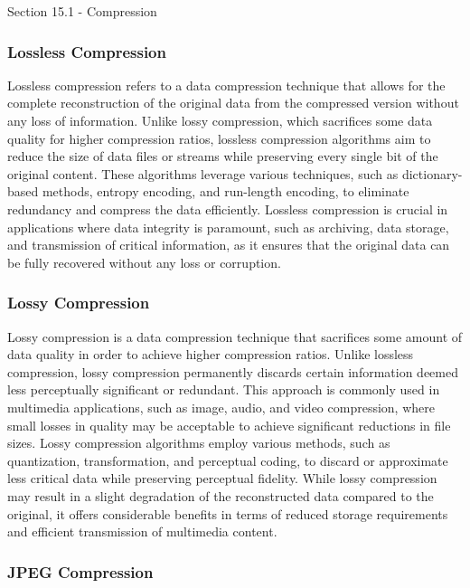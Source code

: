 \begin{notes}{Section 15.1 - Compression}
    \subsubsection{Lossless Compression}
    
    Lossless compression refers to a data compression technique that allows for the complete reconstruction of the original data from the compressed version without any loss of information. Unlike lossy 
    compression, which sacrifices some data quality for higher compression ratios, lossless compression algorithms aim to reduce the size of data files or streams while preserving every single bit of the 
    original content. These algorithms leverage various techniques, such as dictionary-based methods, entropy encoding, and run-length encoding, to eliminate redundancy and compress the data efficiently. 
    Lossless compression is crucial in applications where data integrity is paramount, such as archiving, data storage, and transmission of critical information, as it ensures that the original data can 
    be fully recovered without any loss or corruption.
    
    \subsubsection{Lossy Compression}
    
    Lossy compression is a data compression technique that sacrifices some amount of data quality in order to achieve higher compression ratios. Unlike lossless compression, lossy compression permanently 
    discards certain information deemed less perceptually significant or redundant. This approach is commonly used in multimedia applications, such as image, audio, and video compression, where small 
    losses in quality may be acceptable to achieve significant reductions in file sizes. Lossy compression algorithms employ various methods, such as quantization, transformation, and perceptual coding, 
    to discard or approximate less critical data while preserving perceptual fidelity. While lossy compression may result in a slight degradation of the reconstructed data compared to the original, it 
    offers considerable benefits in terms of reduced storage requirements and efficient transmission of multimedia content.
    
    \subsubsection{JPEG Compression}
    

\end{notes}
